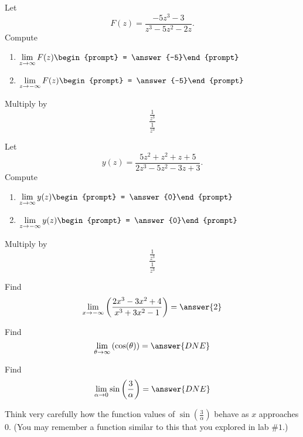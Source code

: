 \documentclass[handout]{ximera}
\begin{document}
\begin{exercise}
Let 
\[
F(z) = \frac{-5 z^3-3}{z^3-5 z^2-2 z}.
\]
Compute
\begin{enumerate}
\item $\displaystyle\lim_{z\to \infty} F(z) \begin{prompt} = \answer{-5}\end{prompt}$
\item $\displaystyle\lim_{z\to -\infty}F(z) \begin{prompt} = \answer{-5}\end{prompt}$
\end{enumerate}
\begin{hint}
Multiply by
\[
\frac{\frac{1}{z^3}}{\frac{1}{z^3}}
\]
\end{hint}
\end{exercise}

\begin{exercise}
Let 
\[
y(z) = \frac{5 z^2+z^2+z+5}{2 z^3-5 z^2-3 z+3}.
\]
Compute
\begin{enumerate}
\item $\displaystyle\lim_{z\to \infty} y(z) \begin{prompt} = \answer{0}\end{prompt}$
\item $\displaystyle\lim_{z\to -\infty}y(z) \begin{prompt} = \answer{0}\end{prompt}$
\end{enumerate}
\begin{hint}
Multiply by
\[
\frac{\frac{1}{z^3}}{\frac{1}{z^3}}
\]
\end{hint}
\end{exercise}

\begin{exercise}
Find
\[
\lim_{x\to-\infty}\left(\frac{2x^3-3x^2+4}{x^3+3x^2-1}\right)
= \answer{2}
\]

\end{exercise}

\begin{exercise}
Find
\[
\lim_{\theta\to\infty}\left(\cos(\theta)\right)
= \answer{DNE}
\]

\end{exercise}

\begin{exercise}
Find
\[
\lim_{\alpha \to 0} \sin\left(\frac{3}{\alpha}\right)
= \answer{DNE}
\]

\begin{hint}
Think very carefully how the function values of $\sin\left(\frac{3}{\alpha}\right)$ behave as $x$ approaches 0.  (You may remember a function similar to this that you explored in lab $\# 1$.) 
\end{hint}

\end{exercise}
\end{document}
